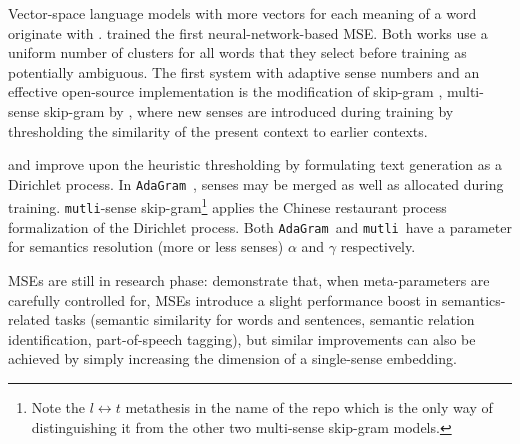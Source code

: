 \documentclass[11pt]{article}
\newcommand{\adagram}{\texttt{AdaGram}}
\newcommand{\mutli}{\texttt{mutli}}
\begin{document}
\label{sec:mse}

Vector-space language models with more vectors for each meaning of a
word originate with \cite{Reisinger:2010}.
\cite{Huang:2012} trained the first neural-network-based MSE.
Both works use a uniform number of clusters for all words that they select
before training as potentially ambiguous.
The first system with adaptive sense numbers and an effective open-source
implementation is the
modification of skip-gram \cite{Mikolov:2013d}, multi-sense skip-gram by
\cite{Neelakantan:2014}, where new senses are introduced during training by
thresholding the similarity of the present context to earlier contexts.



\cite{Bartunov:2015} and \cite{Li:2015} improve upon the heuristic thresholding
by formulating text generation as a Dirichlet process. In
\adagram~\citep{Bartunov:2015}, senses may be merged as well as allocated
during training. \mutli-sense skip-gram\footnote{Note the $l\leftrightarrow
t$ metathesis in the name of the repo which is the only way of distinguishing it
from the other two multi-sense skip-gram models.} \citep{Li:2015} applies the
Chinese restaurant process formalization of the Dirichlet process. Both
\adagram~and \mutli~have a parameter for semantics resolution (more or less
senses) $\alpha$ and $\gamma$ respectively.


MSEs are still in research phase: \cite{Li:2015}  demonstrate that, when
meta-parameters are carefully controlled for, MSEs introduce a slight
performance boost in semantics-related tasks (semantic similarity for words and
sentences, semantic relation identification, part-of-speech tagging), but
similar improvements can also be achieved by simply increasing the dimension of
a single-sense embedding.
\end{document}
